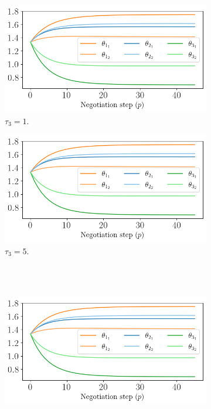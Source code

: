 \documentclass[../main.tex]{subfiles}
\begin{document}
\begin{figure}[h]
  \centering
  \begin{subfigure}{0.45\textwidth}
    \includegraphics[width=\textwidth]{../img/example_primal_decomposition/example_theta.png}
    \caption{$\tau_{3}=1$. }\label{fig:example_vary_tau_lambda_tau_1}
  \end{subfigure}
  \begin{subfigure}{0.45\textwidth}
    \includegraphics[width=\textwidth]{../img/example_primal_decomposition/example_theta.png}
    \caption{$\tau_{3}=5$. }\label{fig:example_vary_tau_lambda_tau_5}
  \end{subfigure}
  \\~\\
  \begin{subfigure}{0.45\textwidth}
    \includegraphics[width=\textwidth]{../img/example_primal_decomposition/example_theta.png}

\end{subfigure}
\end{figure}
\end{document}
